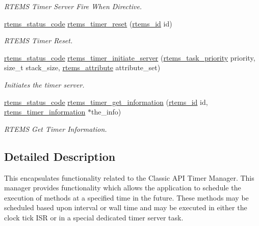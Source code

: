 \begin{DoxyCompactItemize}
\begin{DoxyCompactList}\small\item\em R\+T\+E\+MS Timer Server Fire When Directive. \end{DoxyCompactList}\item 
\mbox{\hyperlink{group__ClassicStatus_ga545d41846817eaba6143d52ee4d9e9fe}{rtems\+\_\+status\+\_\+code}} \mbox{\hyperlink{group__ClassicTimer_ga2880ea0855fd44c5a1ac9a3a65dbdeea}{rtems\+\_\+timer\+\_\+reset}} (\mbox{\hyperlink{group__ClassicTasks_gab20892b814dced7dd4e5b9bf42becd57}{rtems\+\_\+id}} id)
\begin{DoxyCompactList}\small\item\em R\+T\+E\+MS Timer Reset. \end{DoxyCompactList}\item 
\mbox{\hyperlink{group__ClassicStatus_ga545d41846817eaba6143d52ee4d9e9fe}{rtems\+\_\+status\+\_\+code}} \mbox{\hyperlink{group__ClassicTimer_ga9d68afa211264df8cff940b21f80ee31}{rtems\+\_\+timer\+\_\+initiate\+\_\+server}} (\mbox{\hyperlink{group__ClassicTasks_gaa80a0c0938307d1e99d0eb5fee765b47}{rtems\+\_\+task\+\_\+priority}} priority, size\+\_\+t stack\+\_\+size, \mbox{\hyperlink{group__ClassicAttributes_gaea40313cf78ed843e09c4315d0a10f79}{rtems\+\_\+attribute}} attribute\+\_\+set)
\begin{DoxyCompactList}\small\item\em Initiates the timer server. \end{DoxyCompactList}\item 
\mbox{\hyperlink{group__ClassicStatus_ga545d41846817eaba6143d52ee4d9e9fe}{rtems\+\_\+status\+\_\+code}} \mbox{\hyperlink{group__ClassicTimer_gaadb7cf05626eefda2ed454719ae3b2cc}{rtems\+\_\+timer\+\_\+get\+\_\+information}} (\mbox{\hyperlink{group__ClassicTasks_gab20892b814dced7dd4e5b9bf42becd57}{rtems\+\_\+id}} id, \mbox{\hyperlink{structrtems__timer__information}{rtems\+\_\+timer\+\_\+information}} $\ast$the\+\_\+info)
\begin{DoxyCompactList}\small\item\em R\+T\+E\+MS Get Timer Information. \end{DoxyCompactList}\end{DoxyCompactItemize}


\subsection{Detailed Description}
This encapsulates functionality related to the Classic A\+PI Timer Manager. This manager provides functionality which allows the application to schedule the execution of methods at a specified time in the future. These methods may be scheduled based upon interval or wall time and may be executed in either the clock tick I\+SR or in a special dedicated timer server task. 


